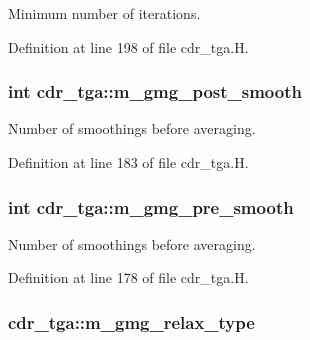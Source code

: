 Minimum number of iterations. 



Definition at line 198 of file cdr\+\_\+tga.\+H.

\subsubsection[{\texorpdfstring{m\+\_\+gmg\+\_\+post\+\_\+smooth}{m_gmg_post_smooth}}]{\setlength{\rightskip}{0pt plus 5cm}int cdr\+\_\+tga\+::m\+\_\+gmg\+\_\+post\+\_\+smooth\hspace{0.3cm}{\ttfamily [protected]}}\hypertarget{classcdr__tga_aa7ce3d85b26d268c0346309ec8beb3fc}{}\label{classcdr__tga_aa7ce3d85b26d268c0346309ec8beb3fc}


Number of smoothings before averaging. 



Definition at line 183 of file cdr\+\_\+tga.\+H.

\subsubsection[{\texorpdfstring{m\+\_\+gmg\+\_\+pre\+\_\+smooth}{m_gmg_pre_smooth}}]{\setlength{\rightskip}{0pt plus 5cm}int cdr\+\_\+tga\+::m\+\_\+gmg\+\_\+pre\+\_\+smooth\hspace{0.3cm}{\ttfamily [protected]}}\hypertarget{classcdr__tga_add66cfe62e2963f1c03a07fb1ade22f9}{}\label{classcdr__tga_add66cfe62e2963f1c03a07fb1ade22f9}


Number of smoothings before averaging. 



Definition at line 178 of file cdr\+\_\+tga.\+H.

\subsubsection[{\texorpdfstring{m\+\_\+gmg\+\_\+relax\+\_\+type}{m_gmg_relax_type}}]{ cdr\+\_\+tga\+::m\+\_\+gmg\+\_\+relax\+\_\+type\hspace{0.3cm}{\ttfamily [protected]}}\hypertarget{classcdr__tga_a1eb73ad38e244760997def4a09d3c7a8}{}\label{classcdr__tga_a1eb73ad38e244760997def4a09d3c7a8}


